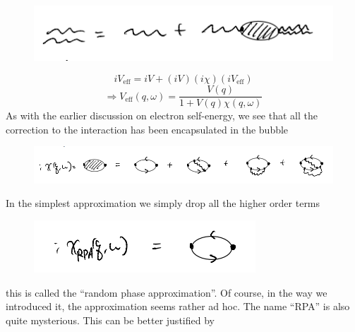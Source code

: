 \begin{figure}[H]
    \centering
    \includegraphics[width=\textwidth]{jupyterbook/data/fig/lec19-fig06.png}
\end{figure}
\[ iV_{\mathrm{eff}}=iV+\left( iV \right) \left( i\chi \right) \left( iV_{\mathrm{eff}} \right) \]
\[ \Rightarrow V_{\mathrm{eff}}\left( q,\omega \right) =\frac{V\left( q \right)}{1+V\left( q \right) \chi \left( q,\omega \right)}\]
As with the earlier discussion on electron self-energy, we see that all the correction to the interaction has been encapsulated in the bubble
\begin{figure}[H]
    \centering
    \includegraphics[width=\textwidth]{jupyterbook/data/fig/lec19-fig07.png}
\end{figure}
In the simplest approximation we simply drop all the higher order terms
\begin{figure}[H]
    \centering
    \includegraphics[width=\textwidth]{jupyterbook/data/fig/lec19-fig08.png}
\end{figure}
this is called the ``random phase approximation''. Of course, in the way we introduced it, the approximation seems rather ad hoc. The name ``RPA'' is also quite mysterious. This can be better justified by

